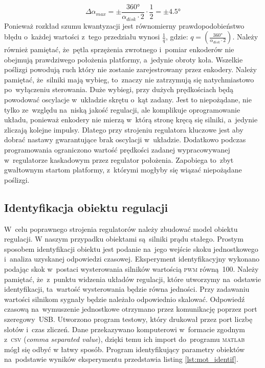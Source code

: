 \documentclass[11pt]{article}
\begin{document}
\begin{equation}
	\label{eq:err_max}
	\Delta \alpha_{max} = \pm \frac{\ang{360}}{\alpha_{disk} \cdot 2} \cdot \frac{1}{2} = \pm \ang{4,5}
\end{equation}
Ponieważ rozkład szumu kwantyzacji jest równomierny prawdopodobieństwo błędu o~każdej wartości z~tego przedziału wynosi $ \frac{1}{q} $, gdzie: $ q = {\left( \frac{\ang{360}}{\alpha_{disk} \cdot 2} \right)} $.
Należy również pamiętać, że~pętla sprzężenia zwrotnego i~pomiar enkoderów nie obejmują prawdziwego położenia platformy, a~jedynie obroty koła.
Wszelkie poślizgi powodują ruch który nie zostanie zarejestrowany przez enkodery.
Należy pamiętać, że~silniki mają wybieg, to~znaczy nie zatrzymują się natychmiastowo po~wyłączeniu sterowania.
Duże wybiegi, przy dużych prędkościach będą powodować oscylacje w~układzie skrętu o~kąt zadany.
Jest to niepożądane, nie tylko ze~względu na~niską jakość regulacji, ale komplikuje oprogramowanie układu, ponieważ enkodery nie mierzą w~którą stronę kręcą się silniki, a~jedynie zliczają kolejne impulsy.
Dlatego przy strojeniu regulatora kluczowe jest aby dobrać nastawy gwarantujące brak oscylacji w~układzie.
Dodatkowo podczas programowania ograniczono wartość prędkości zadanej wypracowywanej w~regulatorze kaskadowym przez regulator położenia.
Zapobiega to~zbyt gwałtownym startom platformy, z~którymi mogłyby się wiązać niepożądane poślizgi.

\subsection{Identyfikacja obiektu regulacji}
W~celu poprawnego strojenia regulatorów należy zbudować model obiektu regulacji.
W naszym przypadku obiektami są~silniki prądu stałego.
Prostym sposobem identyfikacji obiektu jest podanie na~jego wejście skoku jednostkowego i~analiza uzyskanej odpowiedzi czasowej.
Eksperyment identyfikacyjny wykonano podając skok w~postaci wysterowania silników wartością \textsc{pwm} równą~100.
Należy pamiętać, że~z~punktu widzenia układów regulacji, które utworzymy na~odstawie identyfikacji, ta~wartość wysterowania będzie równa jedności.
Przy zadawaniu wartości silnikom sygnały będzie należało odpowiednio skalować.
Odpowiedź czasową na~wymuszenie jednostkowe otrzymano przez komunikację poprzez port szeregowy~USB.
Utworzono program testowy, który drukował przez port liczbę slotów i~czas zliczeń.
Dane przekazywano komputerowi w~formacie zgodnym z~\textsc{csv} (\textit{comma separated value}), dzięki temu ich import do~programu \textsc{matlab} mógł się odbyć w łatwy sposób.
Program identyfikujący parametry obiektów na~podstawie wyników eksperymentu przedstawia listing \ref{lst:mot_identif}.
\end{document}
